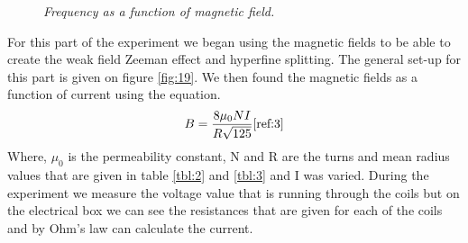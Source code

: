 \documentclass[twocolumn]{article}
\begin{document}
\begin{figure}
\begin{minipage}[t]{0.45\textwidth}
\caption{\textit{Frequency as a function of magnetic field.}}
\label{fig:21}
\end{minipage}
\end{figure}
For this part of the experiment we began using the magnetic fields to be able 
to create the weak field Zeeman effect and hyperfine splitting. The general 
set-up for this part is given on figure \ref{fig:19}. We then found the 
magnetic fields as a function of current using the equation.
\begin{equation}
B = \frac{8\mu_0 NI}{R\sqrt{125}}
\label{eqn:21}
\cite{ref:3}
\end{equation}
Where, $\mu_0$ is the permeability constant, N and R are the turns and mean 
radius values that are given in table \ref{tbl:2} and \ref{tbl:3} and I was 
varied. During the experiment we measure the voltage value that is running 
through the coils but on the electrical box we can see the resistances that 
are given for each of the coils and by Ohm's law can calculate the current.
\end{document}
